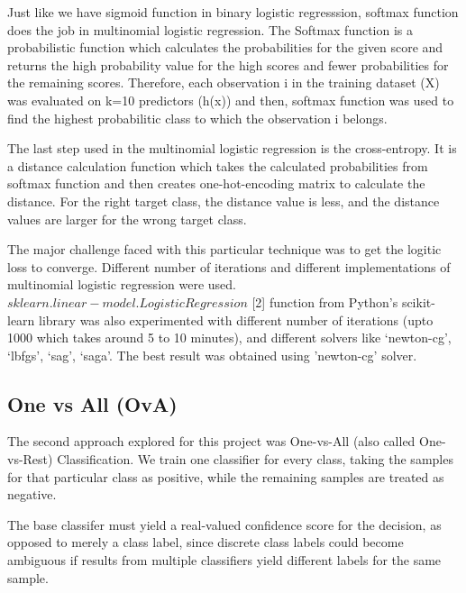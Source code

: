 \documentclass[journal]{IEEEtran}
\begin{document}
Just like we have sigmoid function in binary logistic regresssion, softmax function does the job in multinomial logistic regression. The Softmax function is a probabilistic function which calculates the probabilities for the given score and returns the high probability value for the high scores and fewer probabilities for the remaining scores. Therefore, each observation i in the training dataset (X) was evaluated on k=10 predictors (h(x)) and then, softmax function was used to find the highest probabilitic class to which the observation i belongs. \par
The last step used in the multinomial logistic regression is the cross-entropy. It is a distance calculation function which takes the calculated probabilities from softmax function and then creates one-hot-encoding matrix to calculate the distance. For the right target class, the distance value is less, and the distance values are larger for the wrong target class. \par
The major challenge faced with this particular technique was to get the logitic loss to converge. Different number of iterations and different implementations of multinomial logistic regression were used. $sklearn.linear-model.LogisticRegression$ [2] function from Python's scikit-learn library was also experimented with different number of iterations (upto 1000 which takes around 5 to 10 minutes), and different solvers like ‘newton-cg’, ‘lbfgs’, ‘sag’, ‘saga’. The best result was obtained using 'newton-cg' solver. 

\subsection{One vs All (OvA)}
The second approach explored for this project was One-vs-All (also called One-vs-Rest) Classification. We train one classifier for every class, taking the samples for that particular class as positive, while the remaining samples are treated as negative. \par
The base classifer must yield a real-valued confidence score for the decision, as opposed to merely a class label, since discrete class labels could become ambiguous if results from multiple classifiers yield different labels for the same sample. \par
\end{document}
